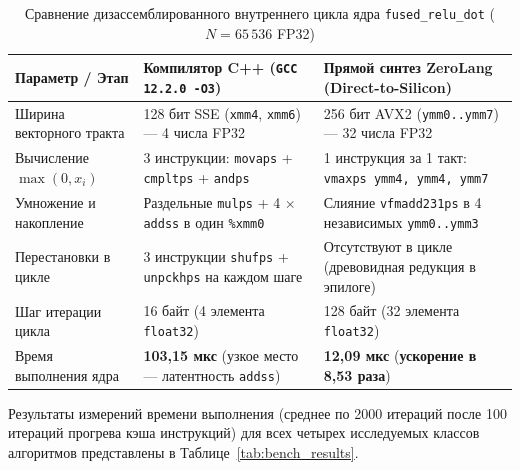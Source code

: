 \documentclass[11pt,a4paper]{article}
\begin{document}
\begin{table}[ht!]
\centering
\caption{Сравнение дизассемблированного внутреннего цикла ядра \texttt{fused\_relu\_dot} ($N = 65\,536$ FP32)}
\label{tab:opcode_cmp}
\vspace{4pt}
\begin{tabularx}{\textwidth}{l X X}
\toprule
\textbf{Параметр / Этап} & \textbf{Компилятор C++ (\texttt{GCC 12.2.0 -O3})} & \textbf{Прямой синтез ZeroLang (Direct-to-Silicon)} \\
\midrule
Ширина векторного тракта & 128 бит SSE (\texttt{xmm4}, \texttt{xmm6}) — 4 числа FP32 & 256 бит AVX2 (\texttt{ymm0..ymm7}) — 32 числа FP32 \\
Вычисление $\max(0, x_i)$ & 3 инструкции: \texttt{movaps} + \texttt{cmpltps} + \texttt{andps} & 1 инструкция за 1 такт: \texttt{vmaxps ymm4, ymm4, ymm7} \\
Умножение и накопление & Раздельные \texttt{mulps} + 4 $\times$ \texttt{addss} в один \texttt{\%xmm0} & Слияние \texttt{vfmadd231ps} в 4 независимых \texttt{ymm0..ymm3} \\
Перестановки в цикле & 3 инструкции \texttt{shufps} + \texttt{unpckhps} на каждом шаге & Отсутствуют в цикле (древовидная редукция в эпилоге) \\
Шаг итерации цикла & 16 байт (4 элемента \texttt{float32}) & 128 байт (32 элемента \texttt{float32}) \\
Время выполнения ядра & \textbf{103,15 мкс} (узкое место — латентность \texttt{addss}) & \textbf{12,09 мкс} (\textbf{ускорение в 8,53 раза}) \\
\bottomrule
\end{tabularx}
\end{table}

Результаты измерений времени выполнения (среднее по 2000 итераций после 100 итераций прогрева кэша инструкций) для всех четырех исследуемых классов алгоритмов представлены в Таблице~\ref{tab:bench_results}.
\end{document}
